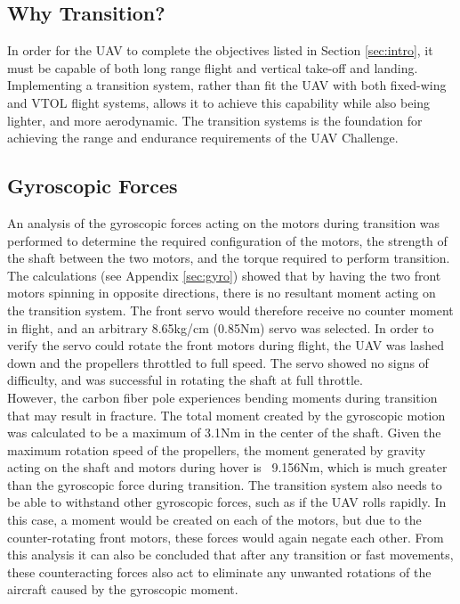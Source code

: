 \label{sec:transition}
\subsection{Why Transition?}
In order for the UAV to complete the objectives listed in Section \ref{sec:intro}, it must be capable of both long range flight and vertical take-off and landing. Implementing a transition system, rather than fit the UAV with both fixed-wing and VTOL flight systems, allows it to achieve this capability while also being lighter, and more aerodynamic. The transition systems is the foundation for achieving the range and endurance requirements of the UAV Challenge.

\subsection{Gyroscopic Forces}
An analysis of the gyroscopic forces acting on the motors during transition was performed to determine the required configuration of the motors, the strength of the shaft between the two motors, and the torque required to perform transition. The calculations (see Appendix  \ref{sec:gyro}) showed that by having the two front motors spinning in opposite directions, there is no resultant moment acting on the transition system. The front servo would therefore receive no counter moment in flight, and an arbitrary 8.65kg/cm (0.85Nm) servo was selected. In order to verify the servo could rotate the front motors during flight, the UAV was lashed down and the propellers throttled to full speed. The servo showed no signs of difficulty, and was successful in rotating the shaft at full throttle.\\

However, the carbon fiber pole experiences bending moments during transition that may result in fracture. The total moment created by the gyroscopic motion was calculated to be a maximum of 3.1Nm in the center of the shaft. Given the maximum rotation speed of the propellers, the moment generated by gravity acting on the shaft and motors during hover is ~9.156Nm, which is much greater than the gyroscopic force during transition. The transition system also needs to be able to withstand other gyroscopic forces, such as if the UAV rolls rapidly. In this case, a moment would be created on each of the motors, but due to the counter-rotating front motors, these forces would again negate each other. From this analysis it can also be concluded that after any transition or fast movements, these counteracting forces also act to eliminate any unwanted rotations of the aircraft caused by the gyroscopic moment. 

